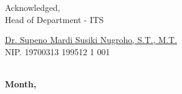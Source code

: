 \endgroup


\begin{center}
  Acknowledged, \\
  Head of \engdepartment{} Department \engfacultyshort{} - ITS \\

  \vspace{8ex}

  \underline{Dr. Supeno Mardi Susiki Nugroho, S.T., M.T.} \\
  NIP. 19700313 199512 1 001
\end{center}

\begin{center}
  \textbf{\MakeUppercase{\place{}}\\Month, \the\year{}}
\end{center}
\endgroup
